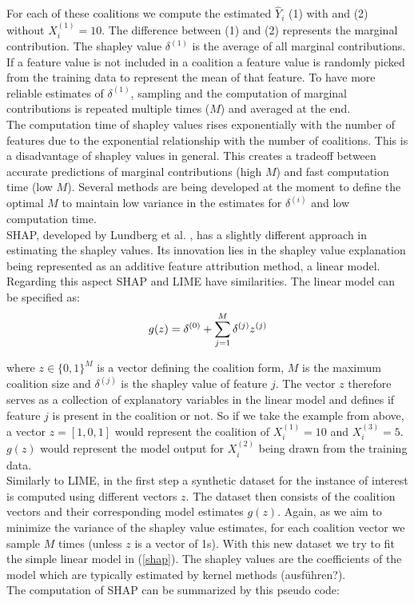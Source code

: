 \documentclass[12pt,titlepage]{article}
\begin{document}
For each of these coalitions we compute the estimated $\hat{Y}_{i}$ (1) with and (2) without $X^{(1)}_{i}=10$. The difference between (1) and (2) represents the marginal contribution. The shapley value $\delta^{(1)}$ is the average of all marginal contributions. If a feature value is not included in a coalition a feature value is randomly picked from the training data to represent the mean of that feature. To have more reliable estimates of $\delta^{(1)}$, sampling and the computation of marginal contributions is repeated multiple times ($M$) and averaged at the end. \\
The computation time of shapley values rises exponentially with the number of features due to the exponential relationship with the number of coalitions. This is a disadvantage of shapley values in general. This creates a tradeoff between accurate predictions of marginal contributions (high $M$) and fast computation time (low $M$). Several methods are being developed at the moment to define the optimal $M$ to maintain low variance in the estimates for $\delta^{(i)}$ and low computation time. \\
SHAP, developed by Lundberg et al. \cite{shap}, has a slightly different approach in estimating the shapley values. Its innovation lies in the shapley value explanation being represented as an additive feature attribution method, a linear model. Regarding this aspect SHAP and LIME have similarities. The linear model can be specified as: \\

\begin{equation} \label{shap}
    g(z) = \delta^{(0)} + \sum_{j=1}^{M} \delta^{(j)}z^{(j)} \\
\end{equation}

where $z\in \{0,1\}^{M}$ is a vector defining the coalition form, $M$ is the maximum coalition size and $\delta^{(j)}$ is the shapley value of feature $j$. The vector $z$ therefore serves as a collection of explanatory variables in the linear model and defines if feature $j$ is present in the coalition or not. So if we take the example from above, a vector $z=[1,0,1]$ would represent the coalition of $X^{(1)}_{i}=10$ and $X^{(3)}_{i}=5$. $g(z)$ would represent the model output for $X^{(2)}_{i}$ being drawn from the training data. \\
Similarly to LIME, in the first step a synthetic dataset for the instance of interest is computed using different vectors $z$. The dataset then consists of the coalition vectors and their corresponding model estimates $g(z)$. Again, as we aim to minimize the variance of the shapley value estimates, for each coalition vector we sample $M$ times (unless $z$ is a vector of 1s). With this new dataset we try to fit the simple linear model in (\ref{shap}). The shapley values are the coefficients of the model which are typically estimated by kernel methods (ausführen?). \\
The computation of SHAP can be summarized by this pseudo code: \\
\end{document}
